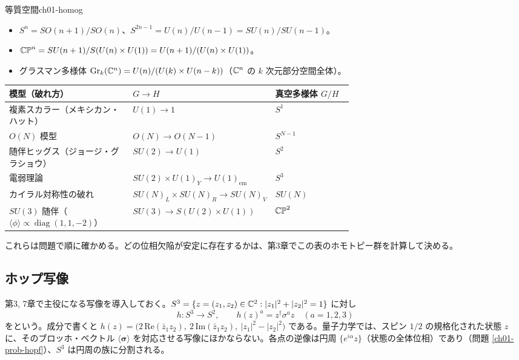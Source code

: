 \begin{myex}{等質空間}{ch01-homog}
\begin{itemize}
\item $S^n=SO(n+1)/SO(n)$、$S^{2n-1}=U(n)/U(n-1)=SU(n)/SU(n-1)$。
\item $\mathbb{CP}^n=SU(n+1)/S(U(n)\times U(1))=U(n+1)/(U(n)\times U(1))$。
\item グラスマン多様体 $\mathrm{Gr}_k(\mathbb{C}^n)=U(n)/(U(k)\times U(n-k))$（$\mathbb{C}^n$ の $k$ 次元部分空間全体）。
\end{itemize}
\end{myex}

\begin{physbox}[：自発的対称性の破れと真空多様体]
\begin{center}
\renewcommand{\arraystretch}{1.2}\small
\begin{tabular}{p{0.36\linewidth}p{0.3\linewidth}l}
模型（破れ方） & $G\to H$ & 真空多様体 $G/H$\\ \hline
複素スカラー（メキシカン・ハット） & $U(1)\to1$ & $S^1$\\
$O(N)$ 模型 & $O(N)\to O(N-1)$ & $S^{N-1}$\\
随伴ヒッグス（ジョージ・グラショウ） & $SU(2)\to U(1)$ & $S^2$\\
電弱理論 & $SU(2)\times U(1)_Y\to U(1)_{\mathrm{em}}$ & $S^3$\\
カイラル対称性の破れ & $SU(N)_L\times SU(N)_R\to SU(N)_V$ & $SU(N)$\\
$SU(3)$ 随伴（$\langle\phi\rangle\propto\operatorname{diag}(1,1,-2)$） & $SU(3)\to S(U(2)\times U(1))$ & $\mathbb{CP}^2$
\end{tabular}
\end{center}
これらは問題で順に確かめる。どの位相欠陥が安定に存在するかは、第3章でこの表のホモトピー群を計算して決める。
\end{physbox}

\subsection{ホップ写像}
第3, 7章で主役になる写像を導入しておく。$S^3=\{z=(z_1,z_2)\in\mathbb{C}^2:\lvert z_1\rvert^2+\lvert z_2\rvert^2=1\}$ に対し
\[
h\colon S^3\to S^2,\qquad h(z)^a=z^\dagger\sigma^az\quad(a=1,2,3)
\]
をという。成分で書くと $h(z)=\bigl(2\,\mathrm{Re}(\bar z_1z_2),\ 2\,\mathrm{Im}(\bar z_1z_2),\ \lvert z_1\rvert^2-\lvert z_2\rvert^2\bigr)$ である。量子力学では、スピン $1/2$ の規格化された状態 $z$ に、そのブロッホ・ベクトル $\langle\bm{\sigma}\rangle$ を対応させる写像にほかならない。各点の逆像は円周 $\{e^{i\alpha}z\}$（状態の全体位相）であり（問題 \ref{ch01-prob-hopf}）、$S^3$ は円周の族に分割される。

